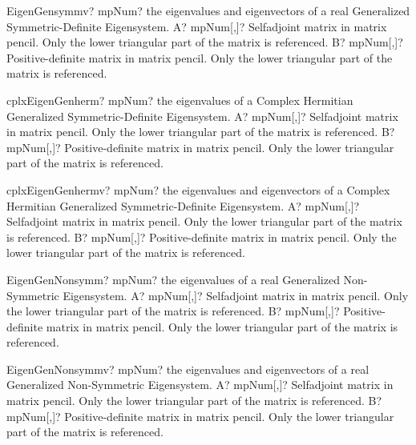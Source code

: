 \documentclass[12pt,a4paper,openany]{book}
\begin{document}
\begin{mpFunctionsExtract}
\mpFunctionTwo
{EigenGensymmv? mpNum? the eigenvalues and eigenvectors of a real Generalized Symmetric-Definite Eigensystem.}
{A? mpNum[,]? Selfadjoint matrix in matrix pencil. Only the lower triangular part of the matrix is referenced.}
{B? mpNum[,]? Positive-definite matrix in matrix pencil. Only the lower triangular part of the matrix is referenced.}
\end{mpFunctionsExtract}

\begin{mpFunctionsExtract}
\mpFunctionTwo
{cplxEigenGenherm? mpNum? the eigenvalues of a Complex Hermitian Generalized Symmetric-Definite Eigensystem.}
{A? mpNum[,]? Selfadjoint matrix in matrix pencil. Only the lower triangular part of the matrix is referenced.}
{B? mpNum[,]? Positive-definite matrix in matrix pencil. Only the lower triangular part of the matrix is referenced.}
\end{mpFunctionsExtract}

\begin{mpFunctionsExtract}
\mpFunctionTwo
{cplxEigenGenhermv? mpNum? the eigenvalues and eigenvectors of a Complex Hermitian Generalized Symmetric-Definite Eigensystem.}
{A? mpNum[,]? Selfadjoint matrix in matrix pencil. Only the lower triangular part of the matrix is referenced.}
{B? mpNum[,]? Positive-definite matrix in matrix pencil. Only the lower triangular part of the matrix is referenced.}
\end{mpFunctionsExtract}

\begin{mpFunctionsExtract}
\mpFunctionTwo
{EigenGenNonsymm? mpNum? the eigenvalues of a real Generalized Non-Symmetric Eigensystem.}
{A? mpNum[,]? Selfadjoint matrix in matrix pencil. Only the lower triangular part of the matrix is referenced.}
{B? mpNum[,]? Positive-definite matrix in matrix pencil. Only the lower triangular part of the matrix is referenced.}
\end{mpFunctionsExtract}

\begin{mpFunctionsExtract}
\mpFunctionTwo
{EigenGenNonsymmv? mpNum? the eigenvalues and eigenvectors of a real Generalized Non-Symmetric Eigensystem.}
{A? mpNum[,]? Selfadjoint matrix in matrix pencil. Only the lower triangular part of the matrix is referenced.}
{B? mpNum[,]? Positive-definite matrix in matrix pencil. Only the lower triangular part of the matrix is referenced.}
\end{mpFunctionsExtract}
\end{document}
